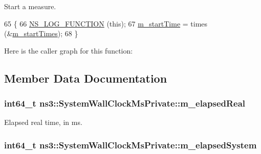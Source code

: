 Start a measure. 
\begin{DoxyCode}
65 \{
66   \hyperlink{log-macros-disabled_8h_a90b90d5bad1f39cb1b64923ea94c0761}{NS\_LOG\_FUNCTION} (\textcolor{keyword}{this});
67   \hyperlink{classns3_1_1SystemWallClockMsPrivate_afccba62a8e771adfc7455bd8a5c15530}{m\_startTime} = times (&\hyperlink{classns3_1_1SystemWallClockMsPrivate_afd7e8cf04dc6d964b8b6b304de51124f}{m\_startTimes});
68 \}
\end{DoxyCode}


Here is the caller graph for this function\+:




\subsection{Member Data Documentation}
\subsubsection[{\texorpdfstring{m\+\_\+elapsed\+Real}{m_elapsedReal}}]{\setlength{\rightskip}{0pt plus 5cm}int64\+\_\+t ns3\+::\+System\+Wall\+Clock\+Ms\+Private\+::m\+\_\+elapsed\+Real\hspace{0.3cm}{\ttfamily [private]}}\hypertarget{classns3_1_1SystemWallClockMsPrivate_ad01be5afd1be4bdae6bda288e927112d}{}\label{classns3_1_1SystemWallClockMsPrivate_ad01be5afd1be4bdae6bda288e927112d}


Elapsed real time, in ms. 

\subsubsection[{\texorpdfstring{m\+\_\+elapsed\+System}{m_elapsedSystem}}]{\setlength{\rightskip}{0pt plus 5cm}int64\+\_\+t ns3\+::\+System\+Wall\+Clock\+Ms\+Private\+::m\+\_\+elapsed\+System\hspace{0.3cm}{\ttfamily [private]}}\hypertarget{classns3_1_1SystemWallClockMsPrivate_aa45d1ea1ff57fbd9405671f43f6f729a}{}\label{classns3_1_1SystemWallClockMsPrivate_aa45d1ea1ff57fbd9405671f43f6f729a}


